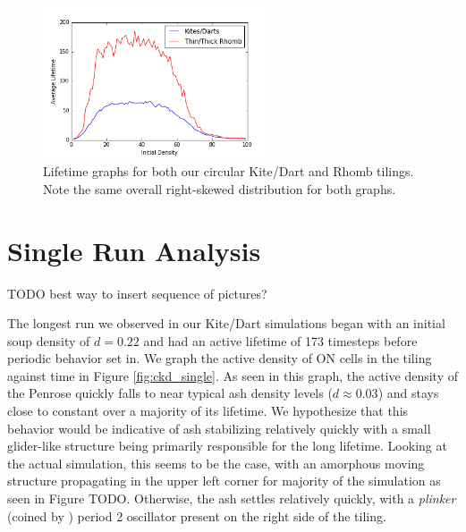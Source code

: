 \documentclass[a4paper,11pt,twoside]{report}
\begin{document}
\begin{figure}[htp]
\centering
\includegraphics[width=0.6\textwidth]{ch4_figs/both_lifetime}
\caption[Kite/Dart and Rhomb Lifetime Graph]{
	Lifetime graphs for both our circular Kite/Dart and Rhomb tilings. Note the same overall right-skewed distribution for both graphs.
}
\label{fig:both_lifetime}
\end{figure}


\section{Single Run Analysis}
\label{sec:ch4_single_run}
TODO best way to insert sequence of pictures?


The longest run we observed in our Kite/Dart simulations began with an initial soup density of $d=0.22$ and had an active lifetime of 173 timesteps before periodic behavior set in. We graph the active density of ON cells in the tiling against time in Figure \ref{fig:ckd_single}. As seen in this graph, the active density of the Penrose quickly falls to near typical ash density levels ($d \approx 0.03$) and stays close to constant over a majority of its lifetime. We hypothesize that this behavior would be indicative of ash stabilizing relatively quickly with a small glider-like structure being primarily responsible for the long lifetime. Looking at the actual simulation, this seems to be the case, with an amorphous moving structure propagating in the upper left corner for majority of the simulation as seen in Figure TODO. Otherwise, the ash settles relatively quickly, with a \textit{plinker} (coined by \citeauthor{hi05}) period 2 oscillator present on the right side of the tiling.
\end{document}
